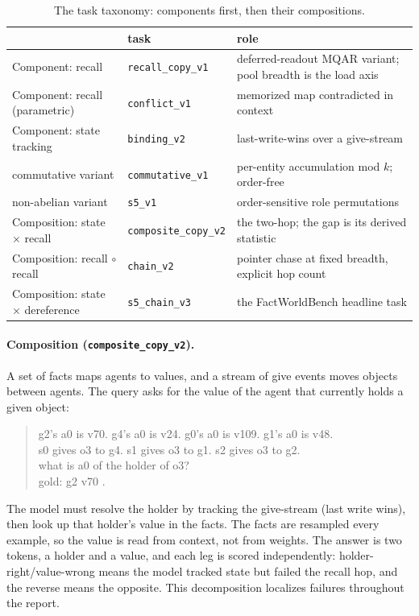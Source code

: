 \documentclass[11pt]{article}
\newcommand{\code}[1]{\texttt{#1}}
\begin{document}
\begin{table}[h]
\centering
\small
\begin{tabular}{llp{7.2cm}}
\toprule
 & task & role \\
\midrule
Component: recall & \code{recall\_copy\_v1} & deferred-readout MQAR variant; pool breadth is the load axis \\
Component: recall (parametric) & \code{conflict\_v1} & memorized map contradicted in context \\
Component: state tracking & \code{binding\_v2} & last-write-wins over a give-stream \\
\quad commutative variant & \code{commutative\_v1} & per-entity accumulation mod $k$; order-free \\
\quad non-abelian variant & \code{s5\_v1} & order-sensitive role permutations \\
Composition: state $\times$ recall & \code{composite\_copy\_v2} & the two-hop; the gap is its derived statistic \\
Composition: recall $\circ$ recall & \code{chain\_v2} & pointer chase at fixed breadth, explicit hop count \\
Composition: state $\times$ dereference & \code{s5\_chain\_v3} & the FactWorldBench headline task \\
\bottomrule
\end{tabular}
\caption{The task taxonomy: components first, then their compositions.}
\end{table}

\paragraph{Composition (\code{composite\_copy\_v2}).} A set of facts maps agents to values,
and a stream of give events moves objects between agents. The query asks for the value of the
agent that currently holds a given object:

\begin{quote}\small\ttfamily
g2's a0 is v70. g4's a0 is v24. g0's a0 is v109. g1's a0 is v48.\\
s0 gives o3 to g4. s1 gives o3 to g1. s2 gives o3 to g2.\\
what is a0 of the holder of o3?\\
gold: g2 v70 .
\end{quote}

The model must resolve the holder by tracking the give-stream (last write wins), then look up
that holder's value in the facts. The facts are resampled every example, so the value is read
from context, not from weights. The answer is two tokens, a holder and a value, and each leg
is scored independently: holder-right/value-wrong means the model tracked state but failed the
recall hop, and the reverse means the opposite. This decomposition localizes failures
throughout the report.
\end{document}
